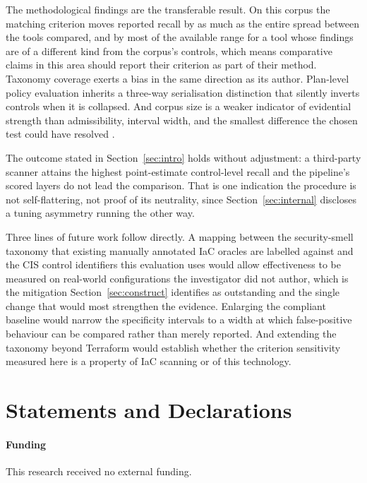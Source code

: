 \documentclass[smallextended]{svjour3}
\begin{document}
The methodological findings are the transferable result. On this corpus the
matching criterion moves reported recall by as much as the entire spread between
the tools compared, and by most of the available range for a tool whose findings
are of a different kind from the corpus's controls, which means comparative
claims in this area should report their criterion as part of their method.
Taxonomy coverage exerts a bias in the same direction as its author. Plan-level
policy evaluation inherits a three-way serialisation distinction that silently
inverts controls when it is collapsed. And corpus size is a weaker indicator of
evidential strength than admissibility, interval width, and the smallest
difference the chosen test could have resolved \citep{bohme2022reliability}.

The outcome stated in Section~\ref{sec:intro} holds without adjustment: a
third-party scanner attains the highest point-estimate control-level recall and
the pipeline's scored layers do not lead the comparison. That is one indication
the procedure is not self-flattering, not proof of its neutrality, since
Section~\ref{sec:internal} discloses a tuning asymmetry running the other way.

Three lines of future work follow directly. A mapping between the security-smell
taxonomy that existing manually annotated IaC oracles are labelled against and
the CIS control identifiers this evaluation uses would allow effectiveness to be
measured on real-world configurations the investigator did not author, which is
the mitigation Section~\ref{sec:construct} identifies as outstanding and the
single change that would most strengthen the evidence. Enlarging the compliant
baseline would narrow the specificity intervals to a width at which
false-positive behaviour can be compared rather than merely reported. And
extending the taxonomy beyond Terraform would establish whether the criterion
sensitivity measured here is a property of IaC scanning or of this technology.

\section*{Statements and Declarations}

\paragraph{Funding} This research received no external funding.
\end{document}
